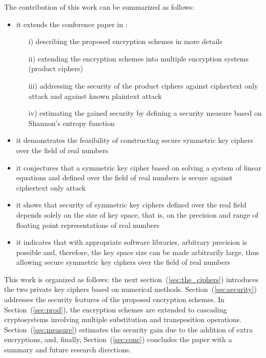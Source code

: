 \documentclass[10pt,journal]{IEEEtran}
\begin{document}
The contribution of this work can be summarized as follows:
\begin{itemize}
\item it extends the conference paper in :
\begin{itemize}
\item [i)] describing the proposed encryption schemes in more details   
\item [ii)] extending the encryption schemes into multiple encryption systems 
   (product ciphers) 
\item [iii)] addressing the security of the product ciphers against ciphertext only 
    attack and against known plaintext attack
\item [iv)] estimating the gained security by defining a security measure based on 
    Shannon's entropy function
\end{itemize}

\item it demonstrates the feasibility of constructing secure 
   symmetric key ciphers over the field of real numbers

\item it conjectures that a symmetric key cipher based on solving a 
   system of linear equations and defined over the field of real numbers is 
   secure against ciphertext only attack

\item it shows that security of symmetric key ciphers defined over the real field  depends solely on the size of key space, that is, on the precision and range of floating point representations of real numbers

\item it indicates that with appropriate software libraries, arbitrary precision is possible and, therefore, the key space size can be made arbitrarily large, thus allowing secure symmetric key ciphers over the field of real numbers  
\end{itemize}

This work is organized as follows: the next section~(\ref{sec:the_ciphers})
introduces the two private key ciphers based on numerical methods.  
Section~(\ref{sec:security}) addresses the security features of the proposed 
encryption schemes. In Section~(\ref{sec:prod}), the encryption schemes are 
extended to cascading cryptosystems involving multiple substitution and
transposition operations. Section~(\ref{sec:measure}) estimates the security 
gain due to the addition of extra encryptions, and, finally, Section~(\ref{sec:conc}) 
concludes the paper with a summary and future research directions.
\end{document}
